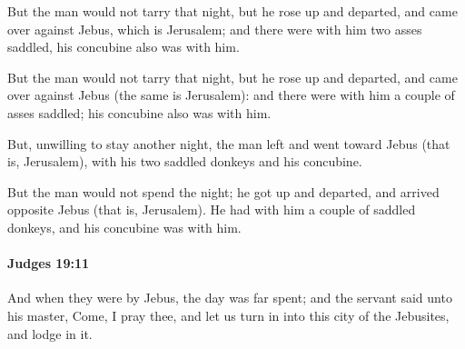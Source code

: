 			But the man would not tarry that night, but he rose up and departed, and came over against Jebus, which is Jerusalem; and there were with him two asses saddled, his concubine also was with him.

			\begin{versebox}
					\item[BHS] 
					\item[ASV] But the man would not tarry that night, but he rose up and departed, and came over against Jebus (the same is Jerusalem): and there were with him a couple of asses saddled; his concubine also was with him.
					\item[NIV] But, unwilling to stay another night, the man left and went toward Jebus (that is, Jerusalem), with his two saddled donkeys and his concubine.
					\item[NRSV] But the man would not spend the night; he got up and departed, and arrived opposite Jebus (that is, Jerusalem). He had with him a couple of saddled donkeys, and his concubine was with him.
			\end{versebox}

		\paragraph{Judges 19:11} %
			\label{JUDGES-19-11}

			And when they were by Jebus, the day was far spent; and the servant said unto his master, Come, I pray thee, and let us turn in into this city of the Jebusites, and lodge in it.


